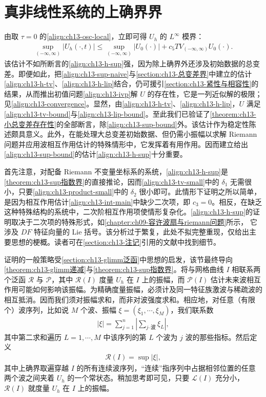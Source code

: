 \documentclass[../../main.tex]{subfiles}
\begin{document}
\section{真非线性系统的上确界界}\label{section:ch13-上确界界}

由取 $\tau=0$ 的\eqref{align:ch13-osc-local}，立即可得 $U_h$ 的 $L^\infty$ 模界：
\begin{align}
\sup_{(-\infty,\infty)}|U_h(\cdot,t)|\leqslant\sup_{(-\infty,\infty)}|U_0(\cdot)|+c_5TV_{(-\infty,\infty)}U_0(\cdot).
\label{align:ch13-sup-naive}
\end{align}
该估计不如所断言的\eqref{align:ch13-h-sup}强，因为除上确界外还涉及初始数据的总变差。即便如此，把\eqref{align:ch13-sup-naive}与\cref{section:ch13-总变差界}中建立的估计\eqref{align:ch13-h-tv}、\eqref{align:ch13-h-lip}结合，仍可援引\cref{section:ch13-紧性与相容性}的结果，从而推出初值问题\eqref{align:ch13-ivp}解 $U$ 的存在性，它是一列近似解的极限；见\eqref{align:ch13-convergence}。显然，由\eqref{align:ch13-h-tv}、\eqref{align:ch13-h-lip}，$U$ 满足\eqref{align:ch13-tv-bound}与\eqref{align:ch13-lip-bound}。至此我们已验证了\cref{theorem:ch13-小总变差存在性}的全部断言，除\eqref{align:ch13-sup-bound}外。该估计作为稳定性陈述颇具意义。此外，在能处理大总变差初始数据、但仍需小振幅以求解 Riemann 问题并应用波相互作用估计的特殊情形中，它发挥着有用作用。因而建立给出\eqref{align:ch13-sup-bound}的估计\eqref{align:ch13-h-sup}十分重要。

首先注意，对配备 Riemann 不变量坐标系的系统，\eqref{align:ch13-h-sup}是\cref{theorem:ch13-sup指数界}的直接推论，因而\eqref{align:ch13-tv-small}中的 $\delta_1$ 无需很小，只要\eqref{align:ch13-product-small}中的 $\delta_2$ 很小即可。此情形下证明之所以简单，是因为相互作用估计\eqref{align:ch13-int-main}中缺少二次项，即 $c_3=0$。相反，在缺乏这种特殊结构的系统中，二次阶相互作用项使情形复杂化。\eqref{align:ch13-h-sup}的证明取决于二次项的特殊形式，如\cref{chapter:ch09-容许波扇与riemann问题}所示，
它涉及 $DF$ 特征向量的 Lie 括号。该分析过于繁复，此处不拟完整重现，仅给出主要思想的梗概。读者可在\cref{section:ch13-注记}引用的文献中找到细节。

证明的一般策略受\cref{section:ch13-glimm泛函}中思想的启发，该节最终导向\cref{theorem:ch13-glimm递减}与\cref{theorem:ch13-sup指数界}。将与网格曲线 $I$ 相联系两个泛函 $\mathscr{R}$ 与 $\mathscr{P}$，其中 $\mathscr{R}(I)$ 度量 $U_h$ 在 $I$ 上的振幅，而 $\mathscr{P}(I)$ 估计未来波相互作用可能如何影响该振幅。为精确度量振幅，必须计及同一特征族激波与稀疏波的相互抵消。因而我们须对振幅求和，而非对波强度求和。相应地，对任意（有限个）波序列，比如说 $M$ 个波、振幅 $\xi=(\xi_1,\cdots,\xi_M)$，我们联系数
\begin{align}
|\xi|=\sum_{j=1}^n\left|\sum_{j\text{--波}}\xi_L\right|,
\label{align:ch13-amplitude-tally}
\end{align}
其中第二求和遍历 $L=1,\cdots,M$ 中该序列的第 $L$ 个波为 $j$ 波的那些指标。然后定义
\begin{align}
\mathscr{R}(I)=\sup|\xi|,
\label{align:ch13-R-def}
\end{align}
其中上确界取遍穿越 $I$ 的所有连续波序列，``连续''指序列中占据相邻位置的任意两个波之间夹着 $U_h$ 的一个常状态。稍加思考即可见，只要 $\mathscr{L}(I)$ 充分小，$\mathscr{R}(I)$ 就度量 $U_h$ 在 $I$ 上的振幅。
\end{document}
